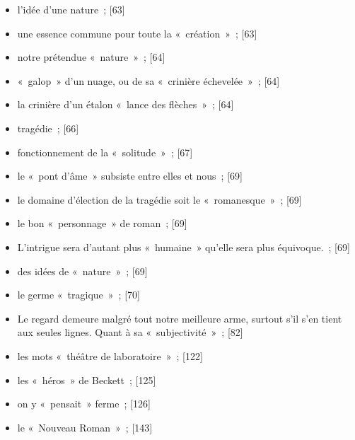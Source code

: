 \documentclass[12pt, a4paper]{article}
\begin{document}
\begin{itemize}
	\item l’idée d’une nature{\color{gray}~; [63]}

	\item une essence commune pour toute la «~création~»{\color{gray}~; [63]}

	\item  notre prétendue «~nature~»{\color{gray}~; [64]}

	\item «~galop~» d’un nuage, ou de sa «~crinière échevelée~»{\color{gray}~; [64]}

	\item la crinière d’un étalon «~lance des flèches~»{\color{gray}~; [64]}

	\item tragédie{\color{gray}~; [66]}

	\item fonctionnement de la «~solitude~»{\color{gray}~; [67]}

	\item le «~pont d’âme~» subsiste entre elles et nous{\color{gray}~; [69]}

	\item le domaine d’élection de la tragédie soit le «~romanesque~»{\color{gray}~; [69]}

	\item le bon «~personnage~» de roman{\color{gray}~; [69]}

	\item L’intrigue sera d’autant plus «~humaine~» qu’elle sera plus équivoque.{\color{gray}~; [69]}

	\item des idées de «~nature~»{\color{gray}~; [69]}

	\item le germe «~tragique~»{\color{gray}~; [70]}

	\item Le regard demeure malgré tout notre meilleure arme, surtout s’il s’en tient aux seules
                  lignes. Quant à sa «~subjectivité~»{\color{gray}~; [82]}

	\item les mots «~théâtre de laboratoire~»{\color{gray}~; [122]}

	\item les «~héros~» de Beckett{\color{gray}~; [125]}

	\item on y «~pensait~» ferme{\color{gray}~; [126]}

	\item le «~Nouveau Roman~»{\color{gray}~; [143]}


\end{itemize}
\end{document}
